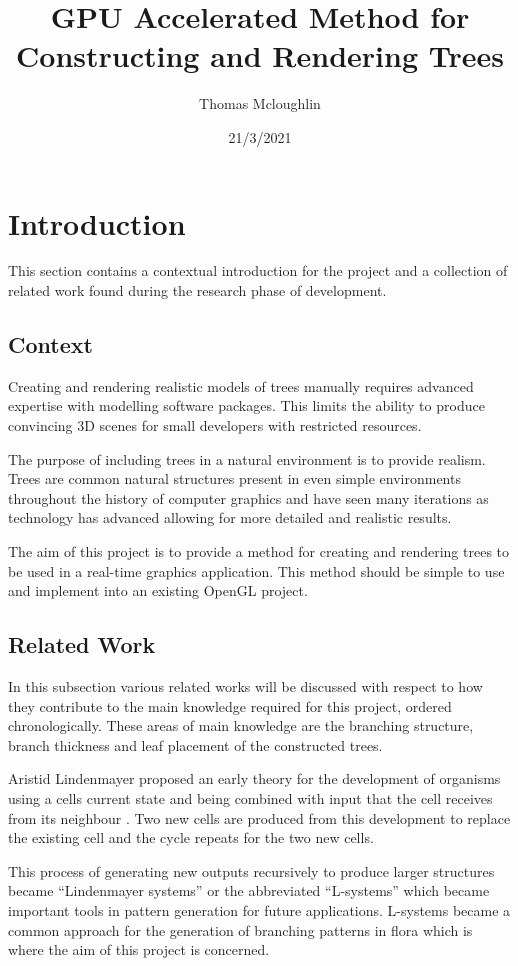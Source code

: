 \documentclass[final]{cmpreport}
\title{GPU Accelerated Method for Constructing and Rendering Trees}
\author{Thomas Mcloughlin}
\date{21/3/2021}
\begin{document}
\section{Introduction}
This section contains a contextual introduction for the project and a collection of 
related work found during the research phase of development. 

\subsection{Context}
Creating and rendering realistic models of trees manually requires advanced expertise 
with modelling software packages. This limits the ability to produce convincing 3D 
scenes for small developers with restricted resources.

The purpose of including trees in a natural environment is to provide realism. 
Trees are common natural structures present in even simple environments 
throughout the history of computer graphics and have seen many iterations as 
technology has advanced allowing for more detailed and realistic results.

The aim of this project is to provide a method for creating and rendering trees 
to be used in a real-time graphics application. This method should be simple to 
use and implement into an existing OpenGL project.

\subsection{Related Work}
In this subsection various related works will be discussed with respect to how they 
contribute to the main knowledge required for this project, ordered chronologically. 
These areas of main knowledge are the branching structure, branch thickness and leaf 
placement of the constructed trees.

Aristid Lindenmayer proposed an early theory for the development 
of organisms using a cells current state and being combined with input that the cell 
receives from its neighbour \citep{lindenmayer1968mathematical1} \citep{lindenmayer1968mathematical2}. 
Two new cells are produced from this development to replace the existing cell and the 
cycle repeats for the two new cells. 

This process of generating new outputs recursively to produce larger structures became
``Lindenmayer systems'' or the abbreviated ``L-systems'' which became important tools 
in pattern generation for future applications. L-systems became a common approach for the 
generation of branching patterns in flora which is where the aim of this project is 
concerned.
\end{document}
